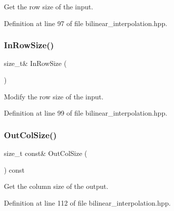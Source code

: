 Get the row size of the input. 



Definition at line 97 of file bilinear\+\_\+interpolation.\+hpp.

\mbox{\label{classmlpack_1_1ann_1_1BilinearInterpolation_a3057ecd053b3a1e5e744efeabc33fec3}} 
\subsubsection{In\+Row\+Size()\hspace{0.1cm}{\footnotesize\ttfamily [2/2]}}
{\footnotesize\ttfamily size\+\_\+t\& In\+Row\+Size (\begin{DoxyParamCaption}{ }\end{DoxyParamCaption})\hspace{0.3cm}{\ttfamily [inline]}}



Modify the row size of the input. 



Definition at line 99 of file bilinear\+\_\+interpolation.\+hpp.

\mbox{\label{classmlpack_1_1ann_1_1BilinearInterpolation_ad414d1f042fe0df8c4ccbbfcb1e3a482}} 
\subsubsection{Out\+Col\+Size()\hspace{0.1cm}{\footnotesize\ttfamily [1/2]}}
{\footnotesize\ttfamily size\+\_\+t const\& Out\+Col\+Size (\begin{DoxyParamCaption}{ }\end{DoxyParamCaption}) const\hspace{0.3cm}{\ttfamily [inline]}}



Get the column size of the output. 



Definition at line 112 of file bilinear\+\_\+interpolation.\+hpp.

